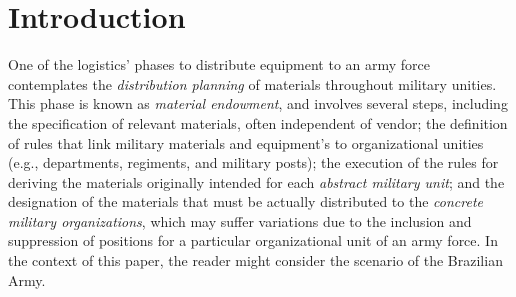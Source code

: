 \section{Introduction}\label{sec:Introduction}


One of the logistics' phases to distribute equipment to an army force contemplates the \emph{distribution planning} of materials throughout military unities. This phase is known as \emph{material endowment}, and involves several steps, including the specification of 
relevant materials, often independent of vendor; the definition of rules that link military materials and equipment's to organizational unities (e.g., departments, regiments, and military posts); the execution of the rules for deriving the materials originally intended for each \emph{abstract military unit}; and the designation of the materials that must be actually distributed to the \emph{concrete military organizations}, which may suffer variations due to the inclusion and suppression of positions for a particular organizational unit of an army force. In the context of this paper, the reader might consider the scenario of the Brazilian Army. 
 

